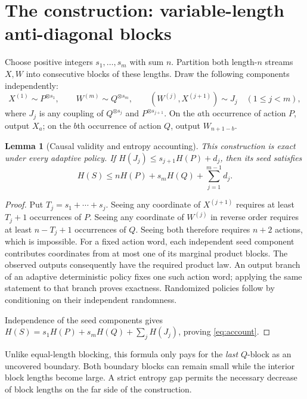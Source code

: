 \documentclass[11pt,a4paper]{article}
\newtheorem{lemma}[theorem]{Lemma}
\begin{document}
\section{The construction: variable-length anti-diagonal blocks}
Choose positive integers $s_1,\ldots,s_m$ with sum $n$. Partition both
length-$n$ streams $X,W$ into consecutive blocks of these lengths. Draw
the following components independently:
\[
X^{(1)}\sim P^{\otimes s_1},\qquad
W^{(m)}\sim Q^{\otimes s_m},\qquad
(W^{(j)},X^{(j+1)})\sim J_j\quad(1\le j<m),
\]
where $J_j$ is any coupling of
$Q^{\otimes s_j}$ and $P^{\otimes s_{j+1}}$.
On the $a$th occurrence of action $P$, output $X_a$; on the $b$th
occurrence of action $Q$, output $W_{n+1-b}$.

\begin{lemma}[Causal validity and entropy accounting]\label{lem:anti}
This construction is exact under every adaptive policy. If
$H(J_j)\le s_{j+1}H(P)+d_j$, then its seed satisfies
\begin{equation}\label{eq:account}
H(S)\le nH(P)+s_mH(Q)+\sum_{j=1}^{m-1}d_j.
\end{equation}
\end{lemma}
\begin{proof}
Put $T_j=s_1+\cdots+s_j$. Seeing any coordinate of $X^{(j+1)}$
requires at least $T_j+1$ occurrences of $P$. Seeing any coordinate of
$W^{(j)}$ in reverse order requires at least $n-T_j+1$ occurrences of
$Q$. Seeing both therefore requires $n+2$ actions, which is impossible.
For a fixed action word, each independent seed component contributes
coordinates from at most one of its marginal product blocks. The observed
outputs consequently have the required product law. An output branch of
an adaptive deterministic policy fixes one such action word; applying the
same statement to that branch proves exactness. Randomized policies follow
by conditioning on their independent randomness.

Independence of the seed components gives
$H(S)=s_1H(P)+s_mH(Q)+\sum_j H(J_j)$, proving \eqref{eq:account}.
\end{proof}

Unlike equal-length blocking, this formula only pays for the \emph{last}
$Q$-block as an uncovered boundary. Both boundary blocks can remain small
while the interior block lengths become large. A strict entropy gap permits
the necessary decrease of block lengths on the far side of the construction.
\end{document}

